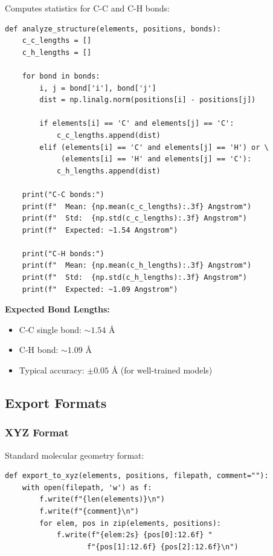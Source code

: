 \documentclass[11pt,a4paper]{article}
\begin{document}
Computes statistics for C-C and C-H bonds:

\begin{lstlisting}[caption={Bond Length Analysis (lines 69-98)}]
def analyze_structure(elements, positions, bonds):
    c_c_lengths = []
    c_h_lengths = []

    for bond in bonds:
        i, j = bond['i'], bond['j']
        dist = np.linalg.norm(positions[i] - positions[j])

        if elements[i] == 'C' and elements[j] == 'C':
            c_c_lengths.append(dist)
        elif (elements[i] == 'C' and elements[j] == 'H') or \
             (elements[i] == 'H' and elements[j] == 'C'):
            c_h_lengths.append(dist)

    print("C-C bonds:")
    print(f"  Mean: {np.mean(c_c_lengths):.3f} Angstrom")
    print(f"  Std:  {np.std(c_c_lengths):.3f} Angstrom")
    print(f"  Expected: ~1.54 Angstrom")

    print("C-H bonds:")
    print(f"  Mean: {np.mean(c_h_lengths):.3f} Angstrom")
    print(f"  Std:  {np.std(c_h_lengths):.3f} Angstrom")
    print(f"  Expected: ~1.09 Angstrom")
\end{lstlisting}

\textbf{Expected Bond Lengths:}
\begin{itemize}
    \item C-C single bond: $\sim 1.54$ Å
    \item C-H bond: $\sim 1.09$ Å
    \item Typical accuracy: $\pm 0.05$ Å (for well-trained models)
\end{itemize}

\subsection{Export Formats}

\subsubsection{XYZ Format}

Standard molecular geometry format:

\begin{lstlisting}[caption={XYZ Export (lines 101-108)}]
def export_to_xyz(elements, positions, filepath, comment=""):
    with open(filepath, 'w') as f:
        f.write(f"{len(elements)}\n")
        f.write(f"{comment}\n")
        for elem, pos in zip(elements, positions):
            f.write(f"{elem:2s} {pos[0]:12.6f} "
                   f"{pos[1]:12.6f} {pos[2]:12.6f}\n")
\end{lstlisting}
\end{document}
